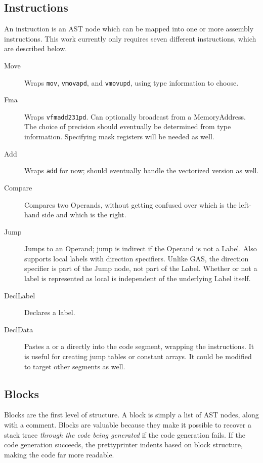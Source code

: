 \subsection{Instructions}

An instruction is an AST node which can be mapped into one or more assembly instructions. This work currently only requires seven different instructions, which are described below. 

\begin{description}
  \item [Move] Wraps \verb|mov|, \verb|vmovapd|, and \verb|vmovupd|, using type information to choose. 
  \item [Fma] Wraps \verb|vfmadd231pd|. Can optionally broadcast from a MemoryAddress. The choice of precision should eventually be determined from type information. Specifying mask registers will be needed as well.
  \item [Add] Wraps \verb|add| for now; should eventually handle the vectorized version as well. 
  \item [Compare] Compares two Operands, without getting confused over which is the left-hand side and which is the right.
  \item [Jump] Jumps to an Operand; jump is indirect if the Operand is not a Label. Also supports local labels with direction specifiers. Unlike GAS, the direction specifier is part of the Jump node, not part of the Label. Whether or not a label is represented as local is independent of the underlying Label itself.
  \item [DeclLabel] Declares a label.
  \item [DeclData] Pastes a  or a  directly into the code segment, wrapping the  instructions. It is useful for creating jump tables or constant arrays. It could be modified to target other segments as well.
\end{description}

\subsection{Blocks} 

Blocks are the first level of structure. A block is simply a list of AST nodes, along with a comment. Blocks are valuable because they make it possible to recover a stack trace \emph{through the code being generated} if the code generation fails. If the code generation succeeds, the prettyprinter indents based on block structure, making the code far more readable. 

